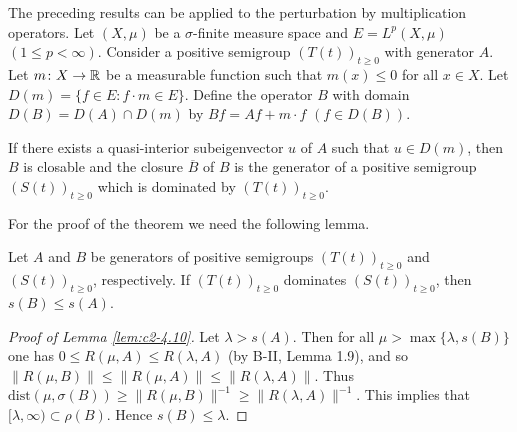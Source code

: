 The preceding results can be applied to the perturbation by multiplication operators. 
Let $(X,\mu)$ be a $\sigma$-finite measure space and $E = L^{p}(X,\mu)$ $(1 \leq p < \infty)$. 
Consider a positive semigroup $(T(t))_{t \geq 0}$ with generator $A$. 
Let $m \colon X \to \mathbb{R}$ be a measurable function such that $m(x) \leq 0$ for all $x \in X$. 
Let $D(m) = \{f \in E \colon f \cdot m \in E\}$. 
Define the operator $B$ with domain $D(B) = D(A) \cap D(m)$ by $Bf = Af + m \cdot f$ $(f \in D(B))$.
\begin{theorem}\label{thm:c2-4.9}
If there exists a quasi-interior subeigenvector $u$ of $A$
such that $u \in D(m)$, then $B$ is closable and the closure $\overline{B}$ of $B$ is the generator of a positive semigroup $(S(t))_{t \geq 0}$ which is dominated by $(T(t))_{t \geq 0}$.
\end{theorem}
For the proof of the theorem we need the following lemma.
\begin{lemma}\label{lem:c2-4.10}
Let $A$ and $B$ be generators of positive semigroups
$(T(t))_{t \geq 0}$ and $(S(t))_{t \geq 0}$, respectively.
If $(T(t))_{t \geq 0}$ dominates
$(S(t))_{t \geq 0}$, then $s(B) \leq s(A)$.
\end{lemma}
\begin{proof}[Proof of Lemma \ref{lem:c2-4.10}]
Let $\lambda > s(A)$.
Then for all $\mu > \max \{\lambda,s(B)\}$ one has $0 \leq R(\mu,A) \leq R(\lambda,A)$ 
(by B-II, Lemma 1.9), and so $\|R(\mu,B)\| \leq  \|R(\mu,A)\| \leq \|R(\lambda,A)\|$.
Thus $\text{dist}(\mu,\sigma(B)) \geq \|R(\mu,B)\|^{-1} \geq \|R(\lambda,A)\|^{-1}$.
This implies that $[\lambda,\infty) \subset \rho(B)$.
Hence $s(B) \leq \lambda$.
\end{proof}
